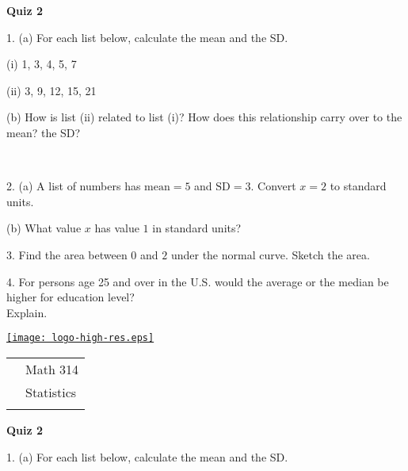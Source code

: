 \documentclass[10pt]{article}
\begin{document}
\begin{center}
\textbf{\large  Quiz 2}
\end{center}
\medskip


1. (a) For each list below, calculate the mean and the SD.

\hspace{20pt} (i) 1, 3, 4, 5, 7\vspace{2.5in}

\hspace{20pt} (ii) 3, 9, 12, 15, 21\vspace{2.5in}

\hphantom{1. } (b) How is list (ii) related to list (i)?  How does this
relationship carry over to the mean?  the SD?

\vfill
\eject
{\ }

2. (a) A list of numbers has $\mbox{mean}=5$ and $\mbox{SD}=3$.
Convert $x=2$ to standard units.
\vspace{1.5in}

\hphantom{2. } (b) What  value $x$ has value $1$ in standard units?
\vspace{1.5in}

3. Find the area between $0$ and $2$ under the normal curve.  Sketch the area.
\vspace{3.5in}

4. For persons age 25 and over in the U.S. would the average or the median be 
higher for education level?\\\hphantom{4. }Explain.
\vfill
\eject




\pagestyle{empty}
\lstset{language=R, showspaces=false, showstringspaces=false}

\href{http://www.shepherd.edu}{\texttt{[image: logo-high-res.eps]}}
\vspace{-1.69cm}

{\small
\begin{tabular}{cl}
& Math 314\\
& Statistics\\
\hspace{5.28in} & %
\end{tabular}
}
\setlength{\baselineskip}{1.05\baselineskip}
\bigskip

\begin{center}
\textbf{\large  Quiz 2}
\end{center}
\medskip


1. (a) For each list below, calculate the mean and the SD.
\end{document}
